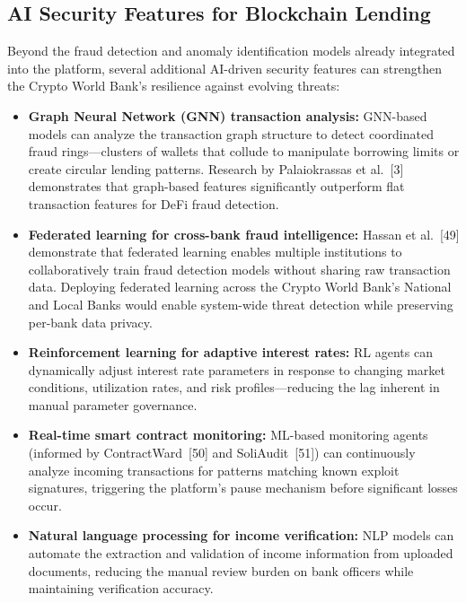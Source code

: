 \documentclass[12pt,a4paper]{report}
\begin{document}
\subsection{AI Security Features for Blockchain Lending}

Beyond the fraud detection and anomaly identification models already integrated into the platform, several additional AI-driven security features can strengthen the Crypto World Bank's resilience against evolving threats:

\begin{itemize}[noitemsep]
\item \textbf{Graph Neural Network (GNN) transaction analysis:} GNN-based models can analyze the transaction graph structure to detect coordinated fraud rings---clusters of wallets that collude to manipulate borrowing limits or create circular lending patterns. Research by Palaiokrassas et al.~[3] demonstrates that graph-based features significantly outperform flat transaction features for DeFi fraud detection.

\item \textbf{Federated learning for cross-bank fraud intelligence:} Hassan et al.~[49] demonstrate that federated learning enables multiple institutions to collaboratively train fraud detection models without sharing raw transaction data. Deploying federated learning across the Crypto World Bank's National and Local Banks would enable system-wide threat detection while preserving per-bank data privacy.

\item \textbf{Reinforcement learning for adaptive interest rates:} RL agents can dynamically adjust interest rate parameters in response to changing market conditions, utilization rates, and risk profiles---reducing the lag inherent in manual parameter governance.

\item \textbf{Real-time smart contract monitoring:} ML-based monitoring agents (informed by ContractWard~[50] and SoliAudit~[51]) can continuously analyze incoming transactions for patterns matching known exploit signatures, triggering the platform's pause mechanism before significant losses occur.

\item \textbf{Natural language processing for income verification:} NLP models can automate the extraction and validation of income information from uploaded documents, reducing the manual review burden on bank officers while maintaining verification accuracy.
\end{itemize}
\end{document}
